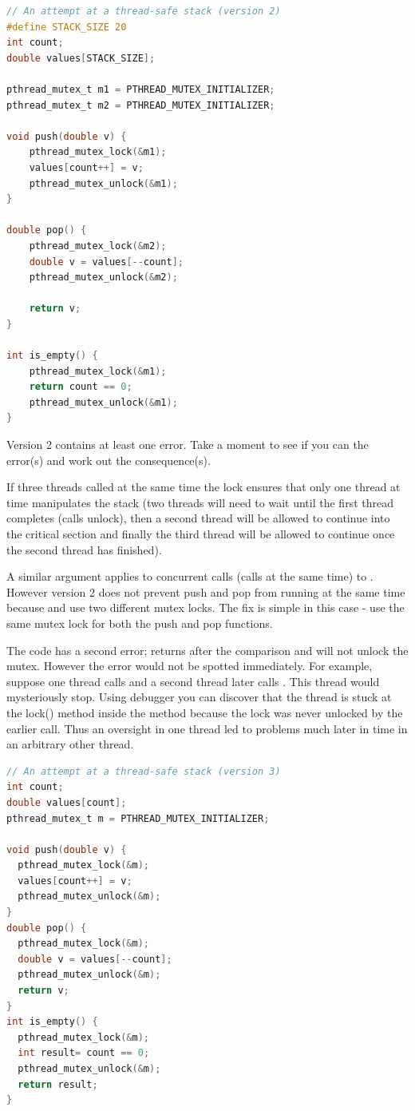 \begin{lstlisting}[language=C]
// An attempt at a thread-safe stack (version 2)
#define STACK_SIZE 20
int count;
double values[STACK_SIZE];

pthread_mutex_t m1 = PTHREAD_MUTEX_INITIALIZER;
pthread_mutex_t m2 = PTHREAD_MUTEX_INITIALIZER;

void push(double v) { 
    pthread_mutex_lock(&m1);
    values[count++] = v;
    pthread_mutex_unlock(&m1);
}

double pop() {
    pthread_mutex_lock(&m2);
    double v = values[--count];
    pthread_mutex_unlock(&m2);

    return v;
}

int is_empty() {
    pthread_mutex_lock(&m1);
    return count == 0;
    pthread_mutex_unlock(&m1);
}
\end{lstlisting}

Version 2 contains at least one error. Take a moment to see if you can the error(s) and work out the consequence(s).

If three threads called  at the same time the lock  ensures that only one thread at time manipulates the stack (two threads will need to wait until the first thread completes (calls unlock), then a second thread will be allowed to continue into the critical section and finally the third thread will be allowed to continue once the second thread has finished).

A similar argument applies to concurrent calls (calls at the same time) to . However version 2 does not prevent push and pop from running at the same time because  and  use two different mutex locks. The fix is simple in this case - use the same mutex lock for both the push and pop functions.

The code has a second error;  returns after the comparison and will not unlock the mutex. However the error would not be spotted immediately. For example, suppose one thread calls  and a second thread later calls . This thread would mysteriously stop. Using debugger you can discover that the thread is stuck at the lock() method inside the  method because the lock was never unlocked by the earlier  call. Thus an oversight in one thread led to problems much later in time in an arbitrary other thread.

\begin{lstlisting}[language=C]
// An attempt at a thread-safe stack (version 3)
int count;
double values[count];
pthread_mutex_t m = PTHREAD_MUTEX_INITIALIZER;

void push(double v) { 
  pthread_mutex_lock(&m); 
  values[count++] = v;
  pthread_mutex_unlock(&m);
}
double pop() {
  pthread_mutex_lock(&m);
  double v = values[--count];
  pthread_mutex_unlock(&m);
  return v;
}
int is_empty() {
  pthread_mutex_lock(&m);
  int result= count == 0;
  pthread_mutex_unlock(&m);
  return result;
}
\end{lstlisting}


